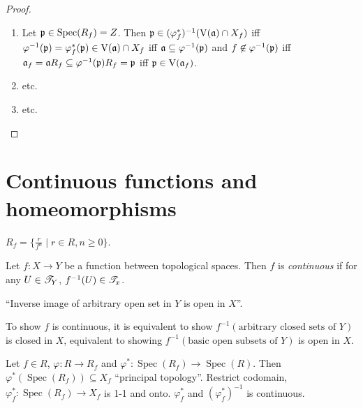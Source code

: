 \begin{proof}
    \begin{enumerate}
        \item Let $\mathfrak{p} \in \operatorname{Spec}(R_f) = Z$. Then $\mathfrak{p} \in (\varphi_f^*)^{-1}(\operatorname{V}(\mathfrak{a}) \cap X_f)$ iff $\varphi^{-1}(\mathfrak{p}) = \varphi_f^*(\mathfrak{p}) \in \operatorname{V}(\mathfrak{a}) \cap X_f$ iff $\mathfrak{a} \subseteq \varphi^{-1}(\mathfrak{p})$ and $f \not \in \varphi^{-1}(\mathfrak{p})$ iff $\mathfrak{a}_f = \mathfrak{a} R_f \subseteq \varphi^{-1}(\mathfrak{p})R_f = \mathfrak{p}$ iff $\mathfrak{p} \in \operatorname{V}(\mathfrak{a}_f)$.
        \item etc.
        \item etc. \qedhere
    \end{enumerate}
\end{proof}

\section*{Continuous functions and homeomorphisms}

$R_f = \{\frac{r}{f^n} \mid r \in R, n \geq 0\}$.

\begin{definition}
    Let $f: X \to Y$ be a function between topological spaces. Then $f$ is \emph{continuous} if for any $U \in \mathscr{T}_Y$, $f^{-1}(U) \in \mathscr{T}_x$. \par 
    ``Inverse image of arbitrary open set in $Y$ is open in $X$''. 
\end{definition}

\begin{fact}
    To show $f$ is continuous, it is equivalent to show $f^{-1}(\text{arbitrary closed sets of $Y$})$ is closed in $X$, equivalent to showing $f^{-1}(\text{basic open subsets of $Y$})$ is open in $X$.
\end{fact}

\begin{theorem}
    Let $f \in R$, $\varphi: R \to R_f$ and $\varphi^*: \operatorname{Spec}(R_f) \to \operatorname{Spec}(R)$. Then  $\varphi^*(\operatorname{Spec}(R_f)) \subseteq X_f$ ``principal topology''. Restrict codomain, $\varphi_f^*: \operatorname{Spec}(R_f) \to X_f$ is 1-1 and onto. $\varphi_f^*$ and $(\varphi_f^*)^{-1}$ is continuous. 
\end{theorem}

